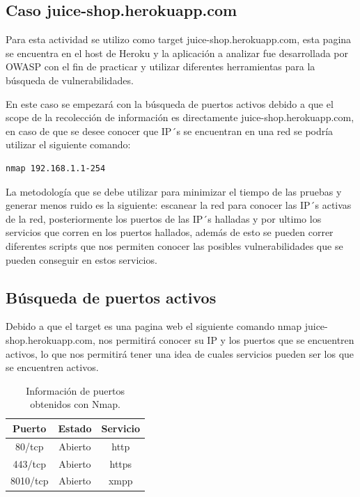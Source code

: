 \documentclass[stu, 11pt, letterpaper, donotrepeattitle, floatsintext, natbib]{apa7}
\begin{document}
\subsection{Caso juice-shop.herokuapp.com} 
Para esta actividad se utilizo como target juice-shop.herokuapp.com, esta pagina se encuentra en el host de Heroku y la aplicación a analizar fue desarrollada por OWASP con el fin de practicar y utilizar diferentes herramientas para la búsqueda de vulnerabilidades.


En este caso se empezará con la búsqueda de puertos activos debido a que el scope de la recolección de información es directamente juice-shop.herokuapp.com, en caso de que se desee conocer que IP´s se encuentran en una red se podría utilizar el siguiente comando:
\newline

\begin{lstlisting}
nmap 192.168.1.1-254
\end{lstlisting}

La metodología que se debe utilizar para minimizar el tiempo de las pruebas y generar menos ruido es la siguiente: escanear la red para conocer las IP´s activas de la red, posteriormente los puertos de las IP´s halladas y por ultimo los servicios que corren en los puertos hallados, además de esto se pueden correr diferentes scripts que nos permiten conocer las posibles vulnerabilidades que se pueden conseguir en estos servicios.


\subsection{Búsqueda de puertos activos} 
Debido a que el target es una pagina web el siguiente comando nmap juice-shop.herokuapp.com, nos permitirá conocer su IP y los puertos que se encuentren activos, lo que nos permitirá tener una idea de cuales servicios pueden ser los que se encuentren activos.

\begin{table}[H]
    \caption{Información de puertos obtenidos con Nmap.}
    \centering
    \begin{tabular}{ccc} %
        \hline 
         Puerto & Estado & Servicio\\
         \hline
         80/tcp & Abierto & http\\
          443/tcp & Abierto & https\\
	8010/tcp & Abierto & xmpp\\
         \hline
    \end{tabular}
    \label{tab:table_words}
\end{table}
\end{document}
